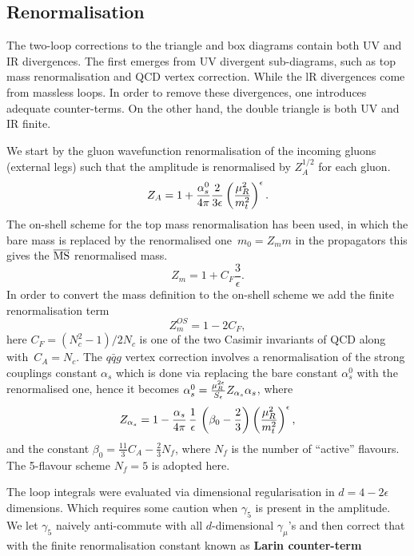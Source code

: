 \subsection{Renormalisation}
\label{subsec:ren}
The two-loop corrections to the triangle and box diagrams contain both UV and IR divergences. The first emerges from UV divergent sub-diagrams, such as top mass renormalisation and QCD vertex correction. While the lR divergences come from massless loops. In order to remove these divergences, one introduces adequate counter-terms.  On the other hand, the double triangle is both UV and IR finite.
\par  We start by the gluon wavefunction renormalisation of the incoming gluons  (external legs) such that the amplitude is renormalised by $ Z_A^{1/2}$ for each gluon.
\begin{equation}
	Z_A= 1+\frac{\alpha_s^0}{4 \pi} \frac{2}{3\epsilon} \left( \frac{\mu_R^2}{m_t^2} \right) ^\epsilon.
\end{equation}
 The on-shell scheme for the top mass renormalisation has been used, in which the bare mass is replaced by the renormalised one~$ m_0 = Z_m m$  in the propagators this gives the $\overline{\mathrm{MS}}$ renormalised mass. 
\begin{equation}
	Z_m = 1+ C_F \frac{3}{\epsilon}.
\end{equation}
In order to convert the mass definition to the on-shell scheme we add the finite renormalisation term
\begin{equation}
	Z^{OS}_m = 1- 2 C_F,
\end{equation}
here $C_F=(N_c^2-1)/2N_c$ is one of the two Casimir invariants of QCD along with~$ C_A=N_c$. 
The $q \bar q g$ vertex correction involves a renormalisation of the strong couplings constant $ \alpha_s$ which is done via replacing the bare constant $\alpha_s^0$ with the renormalised one, hence it becomes  $ \alpha^0_s = \frac{\mu_R^{2\epsilon}}{S_\epsilon}  Z_{\alpha_s} \alpha_s$, where
\begin{equation}
	Z_{\alpha_s} = 1- \frac{\alpha_s}{4 \pi} \, \frac{1}{ \epsilon}\,  \left( \beta_0-\frac{2}{3} \right) \left(\frac{\mu_R^2}{m_t^2} \right) ^\epsilon,
\end{equation}
and the constant $ \beta_0 = \frac{11}{3} C_A -\frac{2}{3}N_f$, where $N_f$ is the number of ``active'' flavours. The 5-flavour scheme $N_f=5$ is adopted here. 
\par The loop integrals were evaluated via dimensional regularisation in $d= 4-2\epsilon$ dimensions. Which requires some caution when $\gamma_5$ is present in the amplitude. We let $\gamma_5$ naively anti-commute with all $d$-dimensional $\gamma_\mu$'s and then correct that with the finite renormalisation constant known as \textbf{ Larin counter-term}~\cite{Larin:1993tq}
